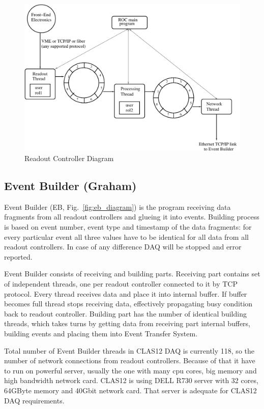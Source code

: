 \begin{figure}[hbt]
	\centering
	\includegraphics[width=1.0\columnwidth,keepaspectratio]{img/roc_diagram.pdf}
	\caption{Readout Controller Diagram}
	\label{fig:roc_diagram}
\end{figure}


\subsection{Event Builder (Graham)}

Event Builder (EB, Fig.~\ref{fig:eb_diagram}) is the program receiving data fragments from all readout controllers and glueing it into events. Building process is based on event number, event type and timestamp of the data fragments: for every particular event all three values have to be identical for all data from all readout controllers. In case of any difference DAQ will be stopped and error reported.

Event Builder consists of receiving and building parts. Receiving part contains set of independent threads, one per readout controller connected to it by TCP protocol. Every thread receives data and place it into internal buffer. If buffer becomes full thread stops receiving data, effectively propagating busy condition back to readout controller.
Building part has the number of identical building threads, which takes turns by getting data from receiving part internal buffers, building events and placing them into Event Transfer System.

Total number of Event Builder threads in CLAS12 DAQ is currently 118, so the number of network connections from readout controllers. Because of that it have to run on powerful server, usually the one with many cpu cores, big memory and high bandwidth network card. CLAS12 is using DELL R730 server with 32 cores, 64GByte memory and 40Gbit network card. That server is adequate for CLAS12 DAQ requirements.

